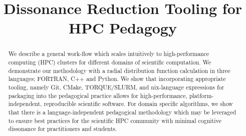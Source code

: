 \documentclass[conference]{IEEEtran}
\begin{document}
\title{Dissonance Reduction Tooling for HPC Pedagogy
}

\author{
	\and
	\and
	\and
	\and
}

\maketitle

\begin{abstract}
	We describe a general work-flow which scales intuitively to high-performance computing (HPC) clusters for different domains of scientific computation. We demonstrate our methodology with a radial distribution function calculation in three languages; FORTRAN, C++ and Python. We show that incorporating appropriate tooling, namely Git, CMake, TORQUE/SLURM, and nix-language expressions for packaging into the pedagogical practice allows for high-performance, platform-independent, reproducible scientific software. For domain specific algorithms, we show that there is a language-independent pedagogical methodology which may be leveraged to ensure best practices for the scientific HPC community with minimal cognitive dissonance for practitioners and students.
\end{abstract}
\end{document}
